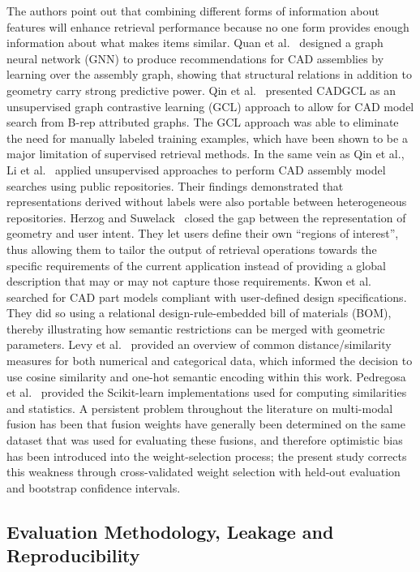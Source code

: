 \documentclass[preprint,12pt]{elsarticle}
\begin{document}
The authors point out that combining different forms of information about features will enhance retrieval performance because no one form provides enough information about what makes items similar.
Quan et al.~\cite{Quan2024} designed a graph neural network (GNN) to produce recommendations for CAD assemblies by learning over the assembly graph, showing that structural relations in addition to geometry carry strong predictive power.
Qin et al.~\cite{Qin2025} presented CADGCL as an unsupervised graph contrastive learning (GCL) approach to allow for CAD model search from B-rep attributed graphs.
The GCL approach was able to eliminate the need for manually labeled training examples, which have been shown to be a major limitation of supervised retrieval methods.
In the same vein as Qin et al., Li et al.~\cite{Li2025} applied unsupervised approaches to perform CAD assembly model searches using public repositories.
Their findings demonstrated that representations derived without labels were also portable between heterogeneous repositories.
Herzog and Suwelack~\cite{Herzog2023} closed the gap between the representation of geometry and user intent.
They let users define their own ``regions of interest'', thus allowing them to tailor the output of retrieval operations towards the specific requirements of the current application instead of providing a global description that may or may not capture those requirements.
Kwon et al.~\cite{Kwon2024} searched for CAD part models compliant with user-defined design specifications.
They did so using a relational design-rule-embedded bill of materials (BOM), thereby illustrating how semantic restrictions can be merged with geometric parameters.
Levy et al.~\cite{Levy2025} provided an overview of common distance/similarity measures for both numerical and categorical data, which informed the decision to use cosine similarity and one-hot semantic encoding within this work.
Pedregosa et al.~\cite{Pedregosa2011} provided the Scikit-learn implementations used for computing similarities and statistics.
A persistent problem throughout the literature on multi-modal fusion has been that fusion weights have generally been determined on the same dataset that was used for evaluating these fusions, and therefore optimistic bias has been introduced into the weight-selection process; the present study corrects this weakness through cross-validated weight selection with held-out evaluation and bootstrap confidence intervals.

\subsection{Evaluation Methodology, Leakage and Reproducibility}
\end{document}
